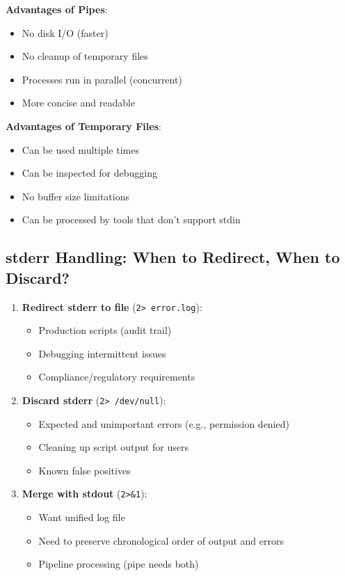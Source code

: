 \textbf{Advantages of Pipes}:
\begin{itemize}
	\item No disk I/O (faster)
	\item No cleanup of temporary files
	\item Processes run in parallel (concurrent)
	\item More concise and readable
\end{itemize}

\textbf{Advantages of Temporary Files}:
\begin{itemize}
	\item Can be used multiple times
	\item Can be inspected for debugging
	\item No buffer size limitations
	\item Can be processed by tools that don't support stdin
\end{itemize}

\subsection{stderr Handling: When to Redirect, When to Discard?}

\begin{enumerate}
	\item \textbf{Redirect stderr to file} (\texttt{2> error.log}):
	      \begin{itemize}
		      \item Production scripts (audit trail)
		      \item Debugging intermittent issues
		      \item Compliance/regulatory requirements
	      \end{itemize}

	\item \textbf{Discard stderr} (\texttt{2> /dev/null}):
	      \begin{itemize}
		      \item Expected and unimportant errors (e.g.,  permission denied)
		      \item Cleaning up script output for users
		      \item Known false positives
	      \end{itemize}

	\item \textbf{Merge with stdout} (\texttt{2>\&1}):
	      \begin{itemize}
		      \item Want unified log file
		      \item Need to preserve chronological order of output and errors
		      \item Pipeline processing (pipe needs both)
	      \end{itemize}
\end{enumerate}

